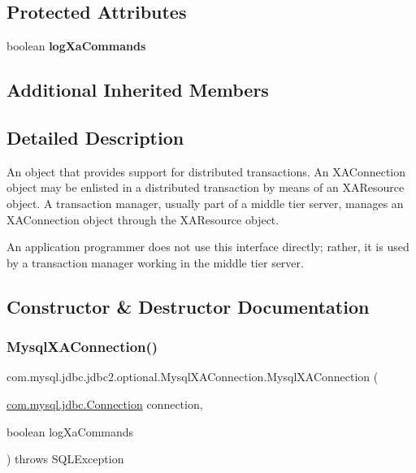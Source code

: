 \subsection*{Protected Attributes}
\begin{DoxyCompactItemize}
\item 
\mbox{\label{classcom_1_1mysql_1_1jdbc_1_1jdbc2_1_1optional_1_1_mysql_x_a_connection_a1739938869dca893f7feca3a170410aa}} 
boolean {\bfseries log\+Xa\+Commands}
\end{DoxyCompactItemize}
\subsection*{Additional Inherited Members}


\subsection{Detailed Description}
An object that provides support for distributed transactions. An {\ttfamily X\+A\+Connection} object may be enlisted in a distributed transaction by means of an {\ttfamily X\+A\+Resource} object. A transaction manager, usually part of a middle tier server, manages an {\ttfamily X\+A\+Connection} object through the {\ttfamily X\+A\+Resource} object.

An application programmer does not use this interface directly; rather, it is used by a transaction manager working in the middle tier server. 

\subsection{Constructor \& Destructor Documentation}
\mbox{\label{classcom_1_1mysql_1_1jdbc_1_1jdbc2_1_1optional_1_1_mysql_x_a_connection_adb324e1831acfb5a867780a35d8c95a0}} 
\subsubsection{\texorpdfstring{Mysql\+X\+A\+Connection()}{MysqlXAConnection()}}
{\footnotesize\ttfamily com.\+mysql.\+jdbc.\+jdbc2.\+optional.\+Mysql\+X\+A\+Connection.\+Mysql\+X\+A\+Connection (\begin{DoxyParamCaption}\item[{\mbox{\hyperlink{interfacecom_1_1mysql_1_1jdbc_1_1_connection}{com.\+mysql.\+jdbc.\+Connection}}}]{connection,  }\item[{boolean}]{log\+Xa\+Commands }\end{DoxyParamCaption}) throws S\+Q\+L\+Exception}


